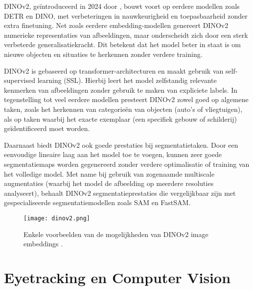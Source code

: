 DINOv2, geïntroduceerd in 2024 door \textcite{Oquab2024}, bouwt voort op eerdere modellen zoals DETR en DINO, met verbeteringen in nauwkeurigheid en toepasbaarheid zonder extra finetuning. 
Net zoals eerdere embedding-modellen genereert DINOv2 numerieke representaties van afbeeldingen, maar onderscheidt zich door een sterk verbeterde generalisatiekracht. 
Dit betekent dat het model beter in staat is om nieuwe objecten en situaties te herkennen zonder verdere training.
\newline \par
DINOv2 is gebaseerd op transformer-architecturen en maakt gebruik van self-supervised learning (SSL). 
Hierbij leert het model zelfstandig relevante kenmerken van afbeeldingen zonder gebruik te maken van expliciete labels. 
In tegenstelling tot veel eerdere modellen presteert DINOv2 zowel goed op algemene taken, zoals het herkennen van categorieën van objecten (auto's of vliegtuigen), als op taken waarbij het exacte exemplaar (een specifiek gebouw of schilderij) geïdentificeerd moet worden. 
\newline \par
Daarnaast biedt DINOv2 ook goede prestaties bij segmentatietaken. Door een eenvoudige lineaire laag aan het model toe te voegen, kunnen zeer goede segmentatiemaps worden gegenereerd zonder verdere optimalisatie of training van het volledige model. 
Met name bij gebruik van zogenaamde multiscale augmentaties (waarbij het model de afbeelding op meerdere resoluties analyseert), 
behaalt DINOv2 segmentatieprestaties die vergelijkbaar zijn met gespecialiseerde segmentatiemodellen zoals SAM en FastSAM.

\begin{figure}[H]
  \centering
  \texttt{[image: dinov2.png]}
  \caption[]{\label{fig:dinov2}Enkele voorbeelden van de mogelijkheden van DINOv2 image embeddings \autocite{Oquab2024}.}
\end{figure}

\section{Eyetracking en Computer Vision}

